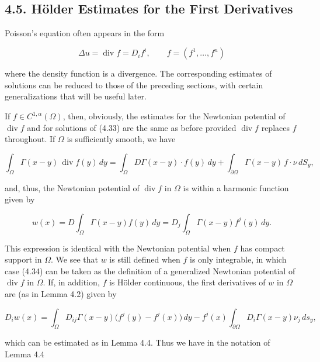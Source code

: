\subsection*{4.5. Hölder Estimates for the First Derivatives}

Poisson’s equation often appears in the form

\begin{equation}
\tag{4.33}
\Delta u=\operatorname{div}f=D_{i}f^{i}, \qquad f=(f^{1},\ldots,f^{n})
\end{equation}

where the density function is a divergence. The corresponding estimates of solutions can be reduced to those of the preceding sections, with certain generalizations that will be useful later.

If $f\in C^{1,\alpha}(\Omega)$, then, obviously, the estimates for the Newtonian potential of $\operatorname{div} f$ and for solutions of (4.33) are the same as before provided $\operatorname{div} f$ replaces $f$ throughout. If $\Omega$ is sufficiently smooth, we have

\[
\int_{\Omega}\Gamma(x-y)\,\operatorname{div}f(y)\,dy
=\int_{\Omega}D\Gamma(x-y)\cdot f(y)\,dy+\int_{\partial\Omega}\Gamma(x-y)\,f\cdot \nu\,dS_{y},
\]



and, thus, the Newtonian potential of $\operatorname{div} f$ in $\Omega$ is within a harmonic function given by

\begin{equation}
\tag{4.34}
w(x)=D\int_{\Omega}\Gamma(x-y)f(y)\,dy=D_{j}\int_{\Omega}\Gamma(x-y)f^{j}(y)\,dy.
\end{equation}

This expression is identical with the Newtonian potential when $f$ has compact support in $\Omega$. We see that $w$ is still defined when $f$ is only integrable, in which case (4.34) can be taken as the definition of a generalized Newtonian potential of $\operatorname{div} f$ in $\Omega$. If, in addition, $f$ is Hölder continuous, the first derivatives of $w$ in $\Omega$ are (as in Lemma 4.2) given by

\begin{equation}
\tag{4.35}
D_{i}w(x)=\int_{\Omega}D_{ij}\Gamma(x-y)\bigl(f^{j}(y)-f^{j}(x)\bigr)\,dy-f^{j}(x)\int_{\partial\Omega}D_{i}\Gamma(x-y)\nu_{j}\,ds_{y},
\end{equation}

which can be estimated as in Lemma 4.4. Thus we have in the notation of Lemma 4.4

